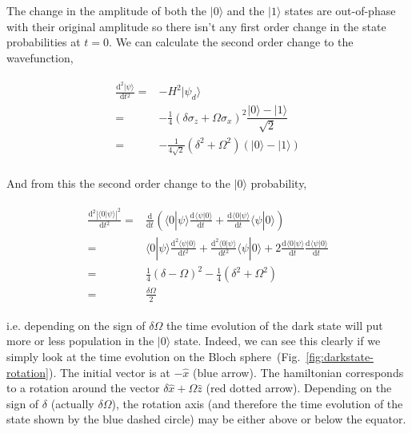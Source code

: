 \documentclass[10pt,fleqn]{article}
\newcommand{\ud}{\mathrm{d}}
\newcommand{\eqar}[1]
{
  \begin{align}
    #1
  \end{align}
}
\newcommand{\paren}[1]{{\left({#1}\right)}}
\newcommand{\abs}[1]{{\left|{#1}\right|}}
\newcommand{\diff}[3][{}]{{\frac{\ud^{#1} {#2}}{\ud {#3}{}^{#1}}}}
\begin{document}
The change in the amplitude of both the $|0\rangle$ and the $|1\rangle$ states
are out-of-phase with their original amplitude so there isn't any first order change
in the state probabilities at $t=0$. We can calculate the second order change
to the wavefunction,
\eqar{
  \begin{split}
    \diff[2]{|\psi\rangle}{t}=&-H^2|\psi_d\rangle\\
    =&-\frac{1}{4}\paren{\delta\sigma_z+\Omega\sigma_x}^2\dfrac{|0\rangle-|1\rangle}{\sqrt2}\\
    =&-\frac{1}{4\sqrt2}\paren{\delta^2+\Omega^2}\paren{|0\rangle-|1\rangle}\\
  \end{split}
}
And from this the second order change to the $|0\rangle$ probability,
\eqar{
  \begin{split}
    \diff[2]{\abs{\langle0|\psi\rangle}^2}{t}=&\diff{}{t}\paren{\langle0|\psi\rangle\diff{\langle\psi|0\rangle}{t}+\diff{\langle0|\psi\rangle}{t}\langle\psi|0\rangle}\\
    =&\langle0|\psi\rangle\diff[2]{\langle\psi|0\rangle}{t}
       +\diff[2]{\langle0|\psi\rangle}{t}\langle\psi|0\rangle
       +2\diff{\langle0|\psi\rangle}{t}\diff{\langle\psi|0\rangle}{t}\\
    =&\frac{1}{4}\paren{\delta-\Omega}^2-\frac{1}{4}\paren{\delta^2+\Omega^2}\\
    =&\frac{\delta\Omega}{2}
  \end{split}
}
i.e. depending on the sign of $\delta\Omega$ the time evolution of the dark state
will put more or less population in the $|0\rangle$ state.
Indeed, we can see this clearly if we simply look at the time evolution
on the Bloch sphere~(Fig.~\ref{fig:darkstate-rotation}).
The initial vector is at $-\hat x$ (blue arrow).
The hamiltonian corresponds to a rotation around the vector
$\delta\hat x+\Omega\hat z$ (red dotted arrow).
Depending on the sign of $\delta$ (actually $\delta\Omega$),
the rotation axis (and therefore the time evolution of the state
shown by the blue dashed circle) may be either above or below the equator.\\
\end{document}
